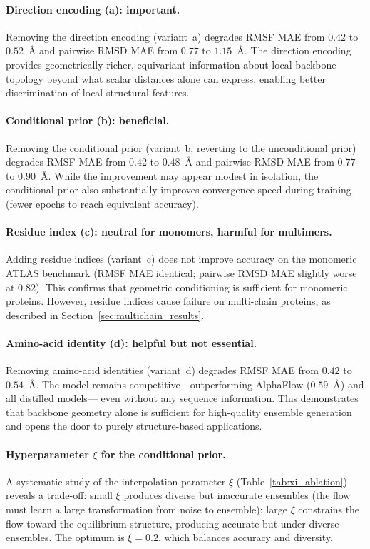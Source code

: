 \documentclass[12pt,a4paper]{article}
\begin{document}
\paragraph{Direction encoding (a): important.}
Removing the direction encoding (variant~a) degrades RMSF MAE from $0.42$ to $0.52$~Å and
pairwise RMSD MAE from $0.77$ to $1.15$~Å.  The direction encoding provides geometrically
richer, equivariant information about local backbone topology beyond what scalar distances
alone can express, enabling better discrimination of local structural features.

\paragraph{Conditional prior (b): beneficial.}
Removing the conditional prior (variant~b, reverting to the unconditional prior) degrades
RMSF MAE from $0.42$ to $0.48$~Å and pairwise RMSD MAE from $0.77$ to $0.90$~Å.  While
the improvement may appear modest in isolation, the conditional prior also substantially
improves convergence speed during training (fewer epochs to reach equivalent accuracy).

\paragraph{Residue index (c): neutral for monomers, harmful for multimers.}
Adding residue indices (variant~c) does not improve accuracy on the monomeric ATLAS benchmark
(RMSF MAE identical; pairwise RMSD MAE slightly worse at $0.82$).  This confirms that
geometric conditioning is sufficient for monomeric proteins.  However, residue indices cause
failure on multi-chain proteins, as described in Section~\ref{sec:multichain_results}.

\paragraph{Amino-acid identity (d): helpful but not essential.}
Removing amino-acid identities (variant~d) degrades RMSF MAE from $0.42$ to $0.54$~Å.
The model remains competitive---outperforming AlphaFlow ($0.59$~Å) and all distilled models---
even without any sequence information.  This demonstrates that backbone geometry alone is
sufficient for high-quality ensemble generation and opens the door to purely structure-based
applications.

\paragraph{Hyperparameter $\xi$ for the conditional prior.}
A systematic study of the interpolation parameter $\xi$ (Table~\ref{tab:xi_ablation})
reveals a trade-off: small $\xi$ produces diverse but inaccurate ensembles (the flow must
learn a large transformation from noise to ensemble); large $\xi$ constrains the flow toward
the equilibrium structure, producing accurate but under-diverse ensembles.  The optimum
is $\xi = 0.2$, which balances accuracy and diversity.
\end{document}
